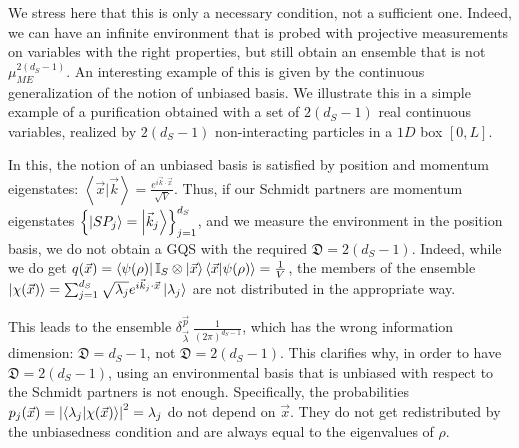 \documentclass[draft,nofootinbib,pre,twocolumn,showpacs,showkeys,groupaddress,preprintnumbers,floatfix]{revtex4-1}
\newcommand{\1}{\mathbbm{1}}
\newcommand{\ID}{\mathfrak{D}}
\begin{document}
We stress here that this is only a necessary condition, not a sufficient one.
Indeed, we can have an infinite environment that is probed with projective
measurements on variables with the right properties, but still obtain an
ensemble that is not $\mu_{ME}^{2(d_S-1)}$. An interesting example of this is
given by the continuous generalization of the notion of unbiased basis. We
illustrate this in a simple example of a purification obtained with a set of
$2(d_S-1)$ real continuous variables, realized by $2(d_S-1)$ non-interacting
particles in a $1D$ box $[0,L]$.

In this, the notion of an unbiased basis is satisfied by position and momentum
eigenstates: $\left\langle \vec{x} \vert \vec{k}\right\rangle = \frac{e^{i
\vec{k}\cdot \vec{x}}}{\sqrt{V}}$. Thus, if our Schmidt partners are momentum
eigenstates $\left\{\ket{SP_j} = \ket{\vec{k}_j}\right\}_{j=1}^{d_S}$, and we
measure the environment in the position basis, we do not obtain a GQS with the
required $\ID = 2(d_S-1)$. Indeed, while we do get $q(\vec{x}) =
\bra{\psi(\rho)} \mathbb{I}_S \otimes \ket{\vec{x}}\bra{\vec{x}}
\ket{\psi(\rho)} = \frac{1}{V}$, the members of the ensemble
$\ket{\chi(\vec{x})} = \sum_{j=1}^{d_S} \sqrt{\lambda_j}e^{i\vec{k}_j \cdot
\vec{x}}\ket{\lambda_j}$ are not distributed in the appropriate way.

This leads to the ensemble
$\delta^{\vec{p}}_{\vec{\lambda}}~\frac{1}{(2\pi)^{d_S-1}}$, which has the
wrong information dimension: $\ID = d_S-1$, not $\ID = 2(d_S-1)$. This
clarifies why, in order to have $\ID = 2(d_S-1)$, using an environmental basis
that is unbiased with respect to the Schmidt partners is not enough.
Specifically, the probabilities $p_j(\vec{x}) = \left\vert
\braket{\lambda_j}{\chi(\vec{x})} \right\vert^2 = \lambda_j$ do not depend on
$\vec{x}$. They do not get redistributed by the unbiasedness condition and are
always equal to the eigenvalues of $\rho$.
\end{document}
